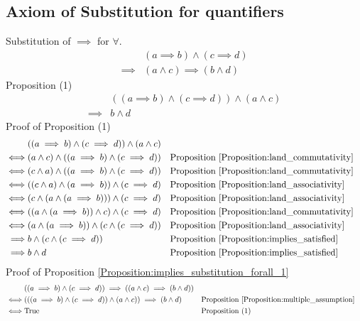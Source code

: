 \subsection{Axiom of Substitution for quantifiers}
\begin{prop}
\label{Proposition:implies_substitution_forall_1}
Substitution of $\implies$ for $\forall$.
\begin{align*}
& (a \implies b) \land (c \implies d) \\
\implies & (a \land c) \implies (b \land d)
\end{align*}
Proposition (1)
\begin{align*}
& ((a \implies b) \land (c \implies d)) \land (a \land c) \\
\implies & b \land d
\end{align*}
Proof of Proposition (1)
\begin{align*}
& ((a \implies b) \land (c \implies d)) \land (a \land c) \\
\iff & (a \land c) \land ((a \implies b) \land (c \implies d))
& & \text{Proposition \ref{Proposition:land_commutativity}} \\
\iff & (c \land a) \land ((a \implies b) \land (c \implies d))
& & \text{Proposition \ref{Proposition:land_commutativity}} \\
\iff & ((c \land a) \land (a \implies b)) \land (c \implies d)
& & \text{Proposition \ref{Proposition:land_associativity}} \\
\iff & (c \land (a \land (a \implies b))) \land (c \implies d)
& & \text{Proposition \ref{Proposition:land_associativity}} \\
\iff & ((a \land (a \implies b)) \land c) \land (c \implies d)
& & \text{Proposition \ref{Proposition:land_commutativity}} \\
\iff & (a \land (a \implies b)) \land (c \land (c \implies d))
& & \text{Proposition \ref{Proposition:land_associativity}} \\
\implies & b \land (c \land (c \implies d))
& & \text{Proposition \ref{Proposition:implies_satisfied}} \\
\implies & b \land d
& & \text{Proposition \ref{Proposition:implies_satisfied}} \\
\end{align*}
Proof of Proposition \ref{Proposition:implies_substitution_forall_1}
\begin{align*}
& ((a \implies b) \land (c \implies d)) \implies ((a \land c) \implies (b \land d)) \\
\iff & (((a \implies b) \land (c \implies d)) \land (a \land c)) \implies (b \land d)
& & \text{Proposition \ref{Proposition:multiple_assumption}} \\
\iff & \text{True}
& & \text{Proposition (1)} \\
\end{align*}
\end{prop}

